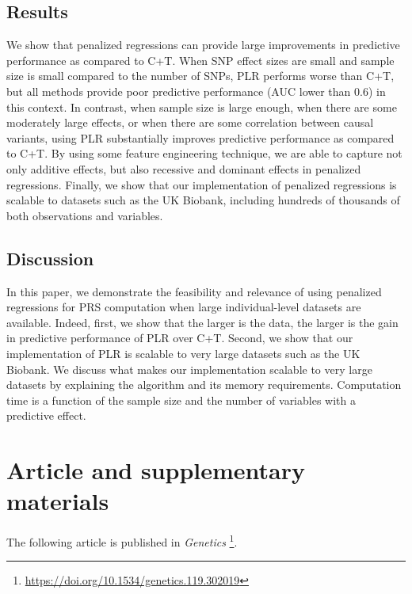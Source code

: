 \subsection{Results}

We show that penalized regressions can provide large improvements in predictive performance as compared to C+T. When SNP effect sizes are small and sample size is small compared to the number of SNPs, PLR performs worse than C+T, but all methods provide poor predictive performance (AUC lower than 0.6) in this context.
In contrast, when sample size is large enough, when there are some moderately large effects, or when there are some correlation between causal variants, using PLR substantially improves predictive performance as compared to C+T.
By using some feature engineering technique, we are able to capture not only additive effects, but also recessive and dominant effects in penalized regressions.
Finally, we show that our implementation of penalized regressions is scalable to datasets such as the UK Biobank, including hundreds of thousands of both observations and variables.

\subsection{Discussion}

In this paper, we demonstrate the feasibility and relevance of using penalized regressions for PRS computation when large individual-level datasets are available. Indeed, first, we show that the larger is the data, the larger is the gain in predictive performance of PLR over C+T. Second, we show that our implementation of PLR is scalable to very large datasets such as the UK Biobank.
We discuss what makes our implementation scalable to very large datasets by explaining the algorithm and its memory requirements.
Computation time is a function of the sample size and the number of variables with a predictive effect.


\section{Article and supplementary materials}

The following article is published in \textit{Genetics}	\footnote{\url{https://doi.org/10.1534/genetics.119.302019}}.



